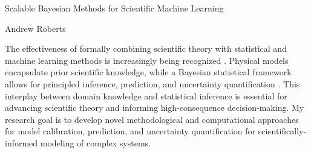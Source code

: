 \documentclass[12pt]{article}
\begin{document}
\begin{center}
Scalable Bayesian Methods for Scientific Machine Learning
\end{center}

\begin{flushright}
Andrew Roberts
\end{flushright} 

The effectiveness of formally combining scientific theory with statistical and machine learning methods is increasingly being recognized \cite{Willcox, Laubmeier, Wikle}. Physical models
encapsulate prior scientific knowledge, while a Bayesian statistical framework allows for principled inference, prediction, and uncertainty quantification \cite{Clark}. This interplay between domain 
knowledge and statistical inference is essential for advancing scientific theory and informing high-consequence decision-making. My research goal is to develop novel methodological 
and computational approaches for model calibration, prediction, and uncertainty quantification for scientifically-informed modeling of complex systems. 
\end{document}

